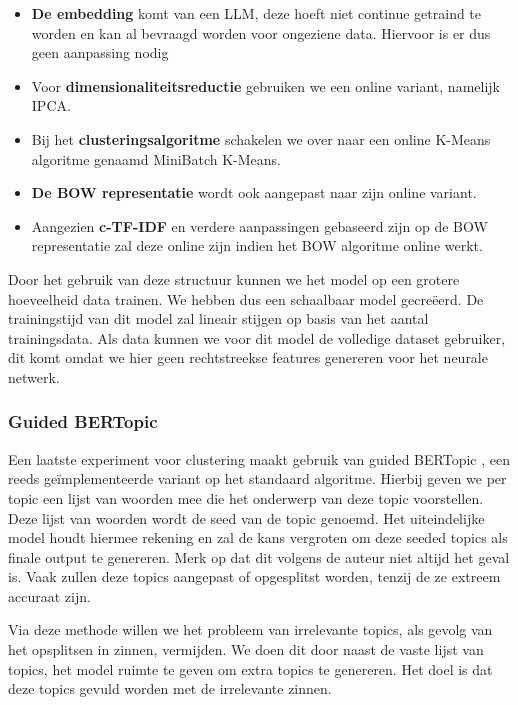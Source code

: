 \begin{itemize}
    \item \textbf{De embedding} komt van een LLM, deze hoeft niet continue getraind te worden en kan al bevraagd worden voor ongeziene data. Hiervoor is er dus geen aanpassing nodig
    \item Voor \textbf{dimensionaliteitsreductie} gebruiken we een online variant, namelijk IPCA.
    \item Bij het \textbf{clusteringsalgoritme} schakelen we over naar een online K-Means algoritme genaamd MiniBatch K-Means.
    \item \textbf{De BOW representatie} wordt ook aangepast naar zijn online variant.
    \item Aangezien \textbf{c-TF-IDF} en verdere aanpassingen gebaseerd zijn op de BOW representatie zal deze online zijn indien het BOW algoritme online werkt.
\end{itemize}


Door het gebruik van deze structuur kunnen we het model op een grotere hoeveelheid data trainen. We hebben dus een schaalbaar model gecreëerd. De trainingstijd van dit model zal lineair stijgen op basis van het aantal trainingsdata. Als data kunnen we voor dit model de volledige dataset gebruiker, dit komt omdat we hier geen rechtstreekse features genereren voor het neurale netwerk.

\subsubsection{Guided BERTopic}
Een laatste experiment voor clustering maakt gebruik van guided BERTopic \cite{bertopic_guided}, een reeds geïmplementeerde variant op het standaard algoritme. Hierbij geven we per topic een lijst van woorden mee die het onderwerp van deze topic voorstellen. Deze lijst van woorden wordt de seed van de topic genoemd. Het uiteindelijke model houdt hiermee rekening en zal de kans vergroten om deze seeded topics als finale output te genereren. Merk op dat dit volgens de auteur niet altijd het geval is. Vaak zullen deze topics aangepast of opgesplitst worden, tenzij de ze extreem accuraat zijn.

Via deze methode willen we het probleem van irrelevante topics, als gevolg van het opsplitsen in zinnen, vermijden. We doen dit door naast de vaste lijst van topics, het model ruimte te geven om extra topics te genereren. Het doel is dat deze topics gevuld worden met de irrelevante zinnen.

